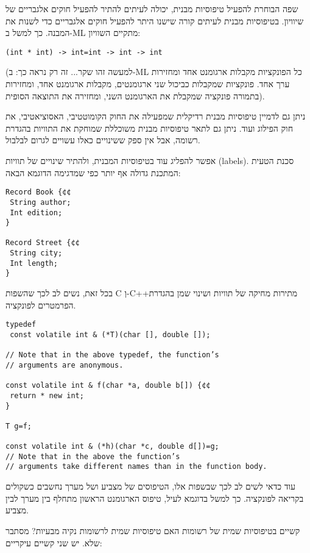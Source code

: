 \begin{טבלא}[!htbp]
      שפה הבוחרת להפעיל טיפוסיות מבנית, יכולה לעיתים להתיר להפעיל חוקים אלגבריים של שיוויון. בטיפוסיות מבנית לעיתים קורה שישנו היתר להפעיל חוקים אלגבריים כדי לשנות את המבנה. כך למשל ב-ML מתקיים השוויון:

\begin{verbatim}
(int * int) -> int=int -> int -> int
\end{verbatim}

      (למעשה זהו שקר... זה רק נראה כך: ב-ML כל הפונקציות מקבלות ארגומנט אחד ומחזירות ערך אחד. פונקציות שמקבלות כביכול שני ארגומנטים, מקבלות ארגומנט אחד, ומחזירות בתמורה פונקציה שמקבלת את הארגומנט השני, ומחזירה את התוצאה הסופית).

      ניתן גם לדמיין טיפוסיות מבנית רדיקלית שמפעילה את החוק הקומוטטיבי, האסוציאטיבי, את חוק הפילוג ועוד. ניתן גם לתאר טיפוסיות מבנית משוכללת שמוחקת את התוויות בהגדרת רשומה, אבל אין ספק ששינויים כאלו עשויים לגרום לבלבול.

      אפשר להפליג עוד בטיפוסיות המבנית, ולהתיר שינויים של תוויות (labels). סכנת הטעית המתכנת גדולה אף יותר כפי שמדגימה הדוגמא הבאה:

\begin{verbatim}
Record Book {¢¢
 String author;
 Int edition;
}

Record Street {¢¢
 String city;
 Int length;
}
\end{verbatim}

      בכל זאת, נשים לב לכך שהשפות C וְ-C++מתירות מחיקה של תוויות ושינוי שמן בהגדרת הפרמטרים לפונקציה.

\begin{verbatim}
typedef
 const volatile int & (*T)(char [], double []);

// Note that in the above typedef, the function’s
// arguments are anonymous.

const volatile int & f(char *a, double b[]) {¢¢
 return * new int;
}

T g=f;

const volatile int & (*h)(char *c, double d[])=g;
// Note that in the above the function’s
// arguments take different names than in the function body.

\end{verbatim}

      עוד כדאי לשים לב לכך שבשפות אלו, הטיפוסים של מצביע ושל מערך נחשבים כשקולים
      בקריאה לפונקציה. כך למשל בדוגמא לעיל, טיפוס הארגומנט הראשון מתחלף בין מערך לבין
      מצביע.

      קשיים בטיפוסיות שמית של רשומות האם טיפוסיות שמית לרשומות נקיה מבעיות? מסתבר
      שלא. יש שני קשיים עיקריים:


\end{טבלא}
